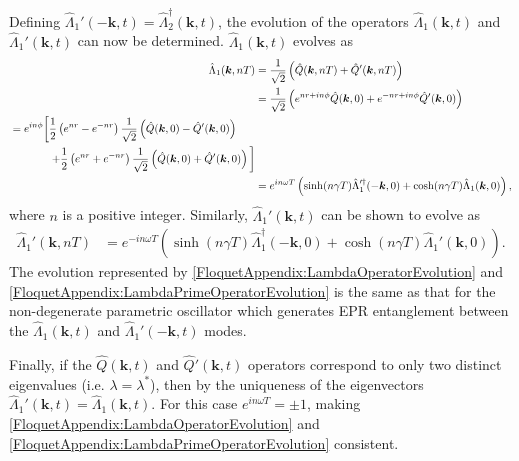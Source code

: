 Defining $\hat{\Lambda}_1'(-\bm{k}, t) = \hat{\Lambda}_2^\dagger(\bm{k}, t)$, the evolution of the operators $\hat{\Lambda}_1(\bm{k}, t)$ and $\hat{\Lambda}_1'(\bm{k}, t)$ can now be determined. $\hat{\Lambda}_1(\bm{k}, t)$ evolves as
\begin{align}
    \hat{\Lambda}_1(\bm{k}, nT) &= \frac{1}{\sqrt{2}} \left(\hat{Q}(\bm{k}, nT) + \hat{Q}'(\bm{k}, nT) \right) \\
        &= \frac{1}{\sqrt{2}} \left( e^{nr + i n\phi} \hat{Q}(\bm{k}, 0) + e^{-nr + i n \phi}\hat{Q}'(\bm{k}, 0)\right) \\
        \begin{split}
            &=  e^{i n \phi} \bigg[ \frac{1}{2}\left( e^{nr} - e^{-nr}\right)\frac{1}{\sqrt{2}}\left(\hat{Q}(\bm{k}, 0) - \hat{Q}'(\bm{k}, 0) \right) \\
            &\relphantom{=e^{i n \phi}\bigg[} + \frac{1}{2} \left( e^{nr} + e^{-nr}\right)\frac{1}{\sqrt{2}} \left( \hat{Q}(\bm{k}, 0) + \hat{Q}'(\bm{k}, 0)\right)\bigg]
        \end{split}\\
        &= e^{i n \omega T} \left( \sinh(n\gamma T) \hat{\Lambda}_1'^\dagger(-\bm{k}, 0) + \cosh(n \gamma T) \hat{\Lambda}_1(\bm{k}, 0)\right), \label{FloquetAppendix:LambdaOperatorEvolution}
\end{align}
where $n$ is a positive integer. Similarly, $\hat{\Lambda}_1'(\bm{k}, t)$ can be shown to evolve as
\begin{align}
    \hat{\Lambda}_1'(\bm{k}, nT) &= e^{-i n \omega T} \left( \sinh(n \gamma T) \hat{\Lambda}_1^\dagger(-\bm{k}, 0) + \cosh(n \gamma T) \hat{\Lambda}_1'(\bm{k}, 0)\right). \label{FloquetAppendix:LambdaPrimeOperatorEvolution}
\end{align}
The evolution represented by \eqref{FloquetAppendix:LambdaOperatorEvolution} and \eqref{FloquetAppendix:LambdaPrimeOperatorEvolution} is the same as that for the non-degenerate parametric oscillator \citep{WallsMilburn} which generates EPR entanglement between the $\hat{\Lambda}_1(\bm{k}, t)$ and $\hat{\Lambda}_1'(-\bm{k}, t)$ modes.

Finally, if the $\hat{Q}(\bm{k}, t)$ and $\hat{Q}'(\bm{k}, t)$ operators correspond to only two distinct eigenvalues (i.e. $\lambda = \lambda^*$), then by the uniqueness of the eigenvectors $\hat{\Lambda}_1'(\bm{k}, t) = \hat{\Lambda}_1(\bm{k}, t)$. For this case $\displaystyle e^{i n\omega T} = \pm 1$, making \eqref{FloquetAppendix:LambdaOperatorEvolution} and \eqref{FloquetAppendix:LambdaPrimeOperatorEvolution} consistent.

